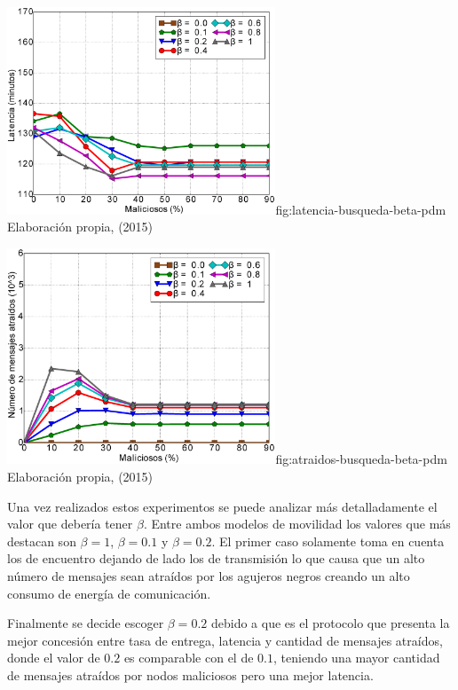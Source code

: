 {\includegraphics[width=0.6\textwidth]{imagenes/seguridad/graficos/latency_pdm_ebr.eps}}{fig:latencia-busqueda-beta-pdm}
{Elaboración propia, (2015)}

{\includegraphics[width=0.6\textwidth]{imagenes/seguridad/graficos/atraidos_pdm_ebr.eps}}{fig:atraidos-busqueda-beta-pdm}
{Elaboración propia, (2015)}



Una vez realizados estos experimentos se puede analizar más detalladamente el
valor que debería tener $\beta$. Entre ambos modelos de movilidad los valores
que más destacan son $\beta = 1$, $\beta = 0.1$ y $\beta = 0.2$. El primer caso
solamente toma en cuenta los \tickets{} de encuentro dejando de lado los de
transmisión lo que causa que un alto número de mensajes sean atraídos por los
agujeros negros creando un alto consumo de energía de comunicación. 

Finalmente se decide escoger $\beta = 0.2$ debido a que es el protocolo que
presenta la mejor concesión entre tasa de entrega, latencia y cantidad de
mensajes atraídos, donde el valor de $0.2$ es comparable con el de $0.1$,
teniendo una mayor cantidad de mensajes atraídos por nodos maliciosos pero una
mejor latencia.

